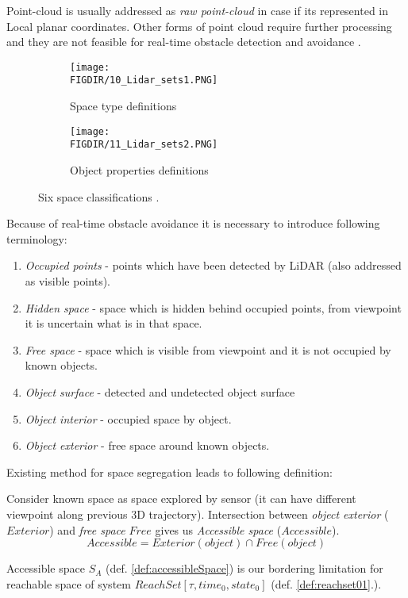 Point-cloud is usually addressed as \textit{raw point-cloud} in case if its represented in Local planar coordinates. Other forms of point cloud require further processing and they are not feasible for real-time obstacle detection and avoidance \cite{chen2007airborne}.

\begin{figure}[H]
    
    \begin{subfigure}{0.5\textwidth}
        \centering
        \texttt{[image: \\FIGDIR/10\_Lidar\_sets1.PNG]} 
        \caption{Space type definitions}
        \label{fig:Spacetypes}
    \end{subfigure}
    \begin{subfigure}{0.5\textwidth}
        \centering
        \texttt{[image: \\FIGDIR/11\_Lidar\_sets2.PNG]}
        \caption{Object properties definitions}
        \label{fig:ObectProperties}
    \end{subfigure}
    
    \caption{Six space classifications \cite{yapo2008probabilistic}.}
    \label{fig:Spaces of interests}
 \end{figure}
 
\noindent  Because of real-time obstacle avoidance it is necessary to introduce following terminology:
\begin{enumerate}
    \item \textit{Occupied points} - points which have been detected by LiDAR (also addressed as visible points).
    \item \textit{Hidden space} - space which is hidden behind occupied points, from viewpoint it is uncertain what is in that space. 
    \item \textit{Free space} - space which is visible from viewpoint and it is not occupied by known objects.
    \item \textit{Object surface} - detected and undetected object surface
    \item \textit{Object interior} - occupied space by object.
    \item \textit{Object exterior} - free space around known objects.
\end{enumerate}

\noindent Existing method for space segregation \cite{yapo2008probabilistic} leads to following definition:

\begin{definition}\label{def:accessibleSpace}
    Consider known space as space explored by sensor (it can have different viewpoint along previous 3D trajectory).
    Intersection between \textit{object exterior} ($Exterior$) and \textit{free space} $Free$ gives us \textit{Accessible space} ($Accessible$).
    \begin{equation}
        Accessible = Exterior(object) \cap Free(object)
    \end{equation}
\end{definition}
 
 \noindent Accessible space $S_A$ (def. \ref{def:accessibleSpace}) is our bordering limitation for reachable space of system $ReachSet[\tau, time_0, state_0]$ (def. \ref{def:reachset01}.).